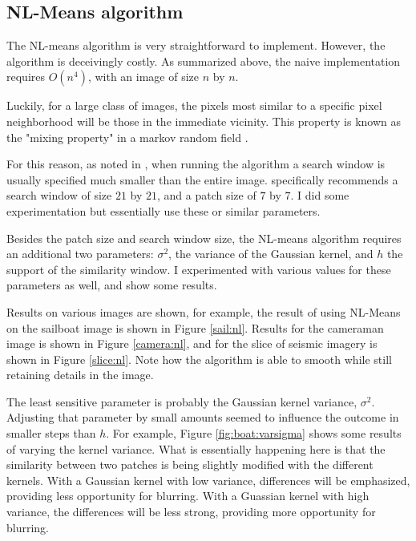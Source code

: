 \documentclass[11pt]{article}
\begin{document}
\subsection{NL-Means algorithm}

The NL-means algorithm is very straightforward to implement.
However, the algorithm is deceivingly costly.  
As summarized above, the naive implementation requires $O(n^4)$, with an image of size $n$ by $n$.

Luckily, for a large class of images, the pixels most similar to a specific pixel neighborhood will be those in the immediate vicinity.
This property is known as the "mixing property" in a markov random field \cite{wikiMRF}.

For this reason, as noted in \cite{buades2005non}, when running the algorithm a search window is usually specified much smaller than the entire image. 
\cite{buades2005non} specifically recommends a search window of size $21$ by $21$, and a patch size of $7$ by $7$.
I did some experimentation but essentially use these or similar parameters.

Besides the patch size and search window size, the NL-means algorithm requires an additional two parameters: $\sigma^2$, the variance of the Gaussian kernel, and $h$ the support of the similarity window.
I experimented with various values for these parameters as well, and show some results.

Results on various images are shown, for example, the result of using NL-Means on the sailboat image is shown in Figure \ref{sail:nl}.
Results for the cameraman image is shown in Figure \ref{camera:nl}, and for the slice of seismic imagery is shown in Figure \ref{slice:nl}.
Note how the algorithm is able to smooth while still retaining details in the image.

The least sensitive parameter is probably the Gaussian kernel variance, $\sigma^2$.
Adjusting that parameter by small amounts seemed to influence the outcome in smaller steps than $h$.
For example, Figure \ref{fig:boat:varsigma} shows some results of varying the kernel variance.
What is essentially happening here is that the similarity between two patches is being slightly modified with the different kernels. 
With a Gaussian kernel with low variance, differences will be emphasized, providing less opportunity for blurring.
With a Guassian kernel with high variance, the differences will be less strong, providing more opportunity for blurring.
\end{document}
